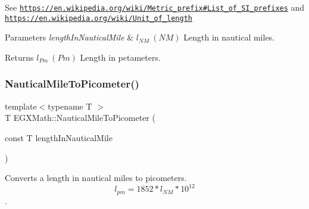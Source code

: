 See \href{https://en.wikipedia.org/wiki/Metric_prefix#List_of_SI_prefixes}{\tt https\+://en.\+wikipedia.\+org/wiki/\+Metric\+\_\+prefix\#\+List\+\_\+of\+\_\+\+S\+I\+\_\+prefixes} and \href{https://en.wikipedia.org/wiki/Unit_of_length}{\tt https\+://en.\+wikipedia.\+org/wiki/\+Unit\+\_\+of\+\_\+length} 
\begin{DoxyParams}{Parameters}
{\em length\+In\+Nautical\+Mile} & $ l_{NM}\ (NM)$ Length in nautical miles. \\
\hline
\end{DoxyParams}
\begin{DoxyReturn}{Returns}
$ l_{Pm}\ (Pm)$ Length in petameters. 
\end{DoxyReturn}
\mbox{\label{group___e_g_x_math-_conversions-_length_conversions-_nautical-_nautical_mile-_s_i_ga5ab6a92054685d45fb032111bcde94e0}} 
\subsubsection{\texorpdfstring{Nautical\+Mile\+To\+Picometer()}{NauticalMileToPicometer()}}
{\footnotesize\ttfamily template$<$typename T $>$ \\
T E\+G\+X\+Math\+::\+Nautical\+Mile\+To\+Picometer (\begin{DoxyParamCaption}\item[{const T}]{length\+In\+Nautical\+Mile }\end{DoxyParamCaption})}



Converts a length in nautical miles to picometers. \[ l_{pm}=1852 * l_{NM} * 10^{12} \]. 

